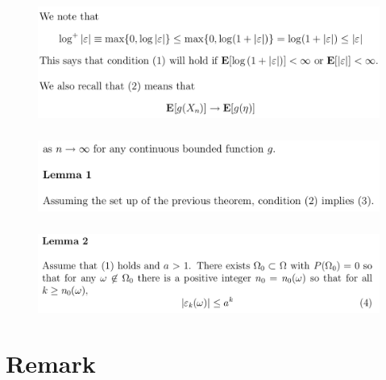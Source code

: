 \documentclass[c, dvipsnames, 8pt]{beamer}
\begin{document}
\begin{frame}[shrink=5]
	
	
	\frametitle{\insertsection} 
	\begin{figure}
		\centering
		\includegraphics[width=1\linewidth]{screenshot051}
		\label{fig:screenshot001}
	\end{figure}
	
		\frametitle{\insertsection} 
	\begin{figure}
		\centering
		\includegraphics[width=1\linewidth]{screenshot052}
		\label{fig:screenshot001}
	\end{figure}
	
	
			\frametitle{\insertsection} 
	\begin{figure}
		\centering
		\includegraphics[width=1\linewidth]{screenshot053}
		\label{fig:screenshot001}
	\end{figure}
	
	
	
	
	
	
\end{frame}


\section{Remark}
\end{document}

